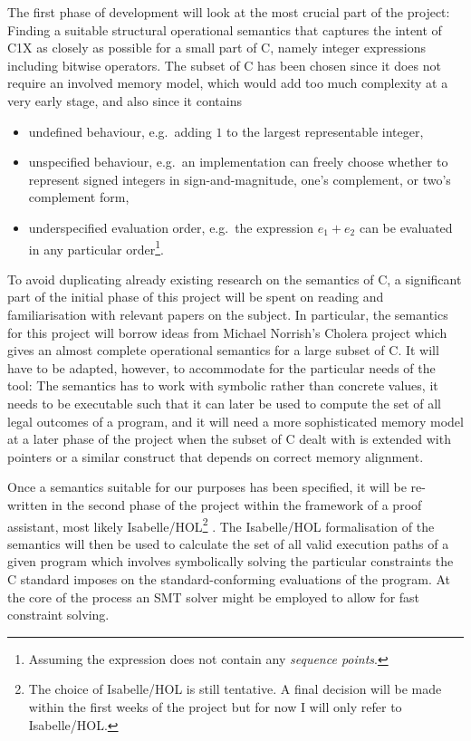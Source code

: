 \documentclass[a4paper,12pt]{scrbook}
\theoremstyle{plain}
\theoremstyle{definition}
\begin{document}
The first phase of development will look at the most crucial part of the project: Finding a suitable structural operational semantics that captures the intent of C1X as closely as possible for a small part of C, namely integer expressions including bitwise operators. The subset of C has been chosen since it does not require an involved memory model, which would add too much complexity at a very early stage, and also since it contains
\begin{itemize}
 \item undefined behaviour, e.g.~adding $1$ to the largest representable integer,
 \item unspecified behaviour, e.g.~an implementation can freely choose whether to represent signed integers in sign-and-magnitude, one's complement, or two's complement form,
 \item underspecified evaluation order, e.g.~the expression $e_1 + e_2$ can be evaluated in any particular order\footnote{Assuming the expression does not contain any \textit{sequence points}.}.
\end{itemize}
To avoid duplicating already existing research on the semantics of C, a significant part of the initial phase of this project will be spent on reading and familiarisation with relevant papers on the subject. In particular, the semantics for this project will borrow ideas from Michael Norrish's Cholera project \cite{norrishPhd} which gives an almost complete operational semantics for a large subset of C. It will have to be adapted, however, to accommodate for the particular needs of the tool: The semantics has to work with symbolic rather than concrete values, it needs to be executable such that it can later be used to compute the set of all legal outcomes of a program, and it will need a more sophisticated memory model at a later phase of the project when the subset of C dealt with is extended with pointers or a similar construct that depends on correct memory alignment.

Once a semantics suitable for our purposes has been specified, it will be re-written in the second phase of the project within the framework of a proof assistant, most likely Isabelle/HOL\footnote{The choice of Isabelle/HOL is still tentative. A final decision will be made within the first weeks of the project but for now I will only refer to Isabelle/HOL.} \cite{isabelle}. The Isabelle/HOL formalisation of the semantics will then be used to calculate the set of all valid execution paths of a given program which involves symbolically solving the particular constraints the C standard imposes on the standard-conforming evaluations of the program. At the core of the process an SMT solver might be employed to allow for fast constraint solving.
\end{document}

